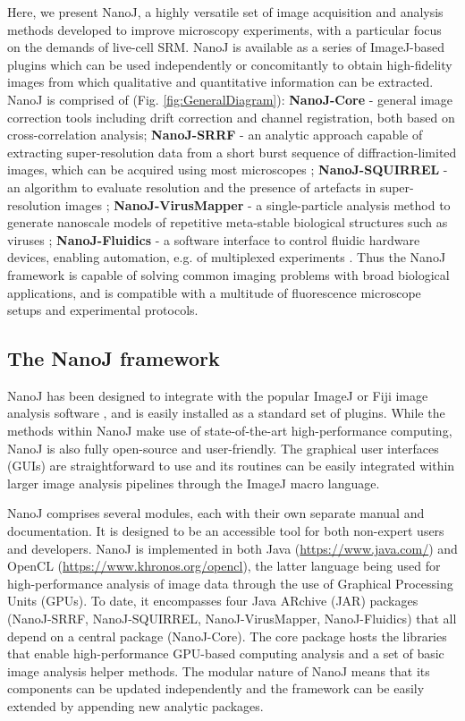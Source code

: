  Here, we present NanoJ, a highly versatile set of image acquisition and analysis methods developed to improve microscopy experiments, with a particular focus on the demands of live-cell SRM. NanoJ is available as a series of ImageJ-based plugins which can be used independently or concomitantly to obtain high-fidelity images from which qualitative and quantitative information can be extracted. NanoJ is comprised of (Fig. \ref{fig:GeneralDiagram}): \textbf{NanoJ-Core} - general image correction tools including drift correction and channel registration, both based on cross-correlation analysis; \textbf{NanoJ-SRRF} - an analytic approach capable of extracting super-resolution data from a short burst sequence of diffraction-limited images, which can be acquired using most microscopes \cite{gustafsson2016fast,culley2018srrf}; \textbf{NanoJ-SQUIRREL} - an algorithm to evaluate resolution and the presence of artefacts in super-resolution images \cite{culley2018quantitative}; \textbf{NanoJ-VirusMapper} - a single-particle analysis method to generate nanoscale models of repetitive meta-stable biological structures such as viruses \cite{gray2016virusmapper,gray2017open,gray2018nanoscale}; \textbf{NanoJ-Fluidics} - a software interface to control fluidic hardware devices, enabling automation, e.g. of multiplexed experiments \cite{almada2018automating}. Thus the NanoJ framework is capable of solving common imaging problems with broad biological applications, and is compatible with a multitude of fluorescence microscope setups and experimental protocols. 
 
\subsection*{The NanoJ framework}
 NanoJ has been designed to integrate with the popular ImageJ or Fiji image analysis software \cite{abramoff2004image,schindelin2012fiji}, and is easily installed as a standard set of plugins. While the methods within NanoJ make use of state-of-the-art high-performance computing, NanoJ is also fully open-source and user-friendly. The graphical user interfaces (GUIs) are straightforward to use and its routines can be easily integrated within larger image analysis pipelines through the ImageJ macro language.

 NanoJ comprises several modules, each with their own separate manual and documentation. It is designed to be an accessible tool for both non-expert users and developers. NanoJ is implemented in both Java (\href{https://www.java.com/}{https://www.java.com/}) and OpenCL (\href{https://www.khronos.org/opencl}{https://www.khronos.org/opencl}), the latter language being used for high-performance analysis of image data through the use of Graphical Processing Units (GPUs). To date, it encompasses four Java ARchive (JAR) packages (NanoJ-SRRF, NanoJ-SQUIRREL, NanoJ-VirusMapper, NanoJ-Fluidics) that all depend on a central package (NanoJ-Core). The core package hosts the libraries that enable high-performance GPU-based computing analysis and a set of basic image analysis helper methods. The modular nature of NanoJ means that its components can be updated independently and the framework can be easily extended by appending new analytic packages.

